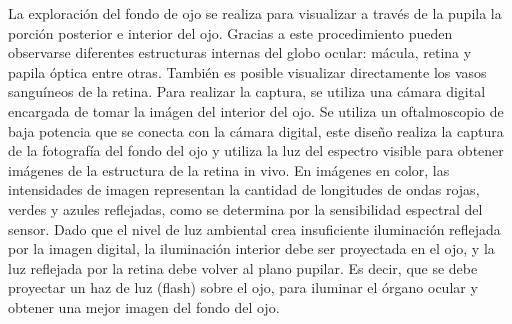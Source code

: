 La exploraci\'on del fondo de ojo se realiza para visualizar a trav\'es de la pupila la porci\'on posterior e interior del ojo. Gracias a este procedimiento pueden observarse diferentes estructuras internas del globo ocular: m\'acula, retina y papila \'optica entre otras. Tambi\'en es posible visualizar directamente los vasos sangu\'ineos de la retina.
Para realizar la captura, se utiliza una c\'amara digital encargada de tomar la im\'agen del interior del ojo. Se utiliza un oftalmoscopio de baja potencia que se conecta con la c\'amara digital, este diseño realiza la captura de la fotograf\'ia del fondo del ojo y utiliza la luz del espectro visible para obtener im\'agenes de la estructura de la retina in vivo. En im\'agenes en color, las intensidades de imagen representan la cantidad de longitudes de ondas rojas, verdes y azules reflejadas, como se determina por la sensibilidad espectral del sensor. Dado que el nivel de luz ambiental crea insuficiente iluminaci\'on reflejada por la imagen digital, la iluminaci\'on interior debe ser proyectada en el ojo, y la luz reflejada por la retina debe volver al plano pupilar. Es decir, que se debe proyectar un haz de luz (flash) sobre el ojo, para iluminar el \'organo ocular y obtener una mejor imagen del fondo del ojo. \cite{kanagasingam2014progress}




